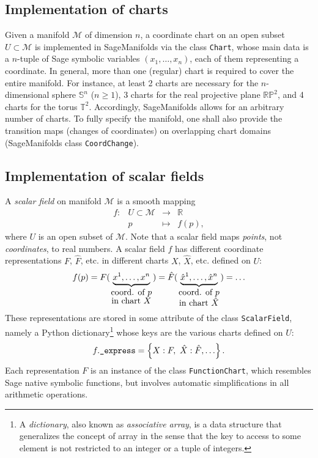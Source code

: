 \documentclass[a4paper]{jpconf}
\newcommand{\soft}[1]{\textsf{#1}}
\newcommand{\code}[1]{\texttt{#1}}
\newcommand{\Sage}{\soft{Sage}}
\newcommand{\SM}{\soft{SageManifolds}}
\newcommand{\be}{\begin{equation}}
\newcommand{\ee}{\end{equation}}
\begin{document}
\subsection{Implementation of charts}

Given a manifold $\mathcal{M}$ of dimension $n$, a coordinate chart 
on an open subset $U\subset\mathcal{M}$ is implemented in \SM{} 
via the class \code{Chart}, whose main data is 
a $n$-tuple of \Sage{} symbolic variables $(x_1,\ldots,x_n)$, each of 
them representing a coordinate.
In general, more than one (regular) chart is required to cover the entire manifold.
For instance, at least 2 charts are necessary for the $n$-dimensional sphere 
$\mathbb{S}^n$ ($n\geq 1$), 3 charts for the real projective plane
$\mathbb{RP}^2$, and 4 charts for the torus $\mathbb{T}^2$. 
Accordingly, \SM{} allows for an arbitrary number of charts. 
To fully specify the manifold, one shall also provide the transition maps
(changes of coordinates) on
overlapping chart domains (\SM{} class \code{CoordChange}).


\subsection{Implementation of scalar fields}

A \emph{scalar field} on manifold $\mathcal{M}$ is a smooth mapping
\be
    \begin{array}{lcll}
    f: & U\subset \mathcal{M}&\longrightarrow &\mathbb{R} \\
       & p & \longmapsto  & f(p) ,
    \end{array}
\ee
where $U$ is an open subset of $\mathcal{M}$.
Note that a scalar field maps \emph{points}, not \emph{coordinates}, to real numbers. 
A scalar field $f$ has different coordinate representations $F$, $\hat F$, etc. 
in different charts $X$, $\hat X$, etc. defined on $U$:
\be
    f(p) = 
F(\underbrace{x^1,\ldots, x^n}_{\mbox{coord. of $p$}\atop\mbox{in chart $X$}}) 
= {\hat F}(\underbrace{{\hat x}^1,\ldots, {\hat x}^n}_{\mbox{coord. of $p$}\atop\mbox{in chart $\hat X$}})
= \ldots
\ee
These representations are 
stored in some attribute of the class \code{ScalarField}, namely a 
Python dictionary\footnote{A \emph{dictionary}, also known as \emph{associative array}, is a 
data structure that generalizes the concept of array in the sense that the
key to access to some element is not restricted to an integer or a tuple of integers.} 
whose keys are the various charts defined on $U$:
\be \label{e:f_express}
 f.\mbox{\texttt{\_express}} = \left\{ X: F,\ \hat X: \hat F, \ldots \right\} .
\ee
Each representation $F$ is an instance of the class \code{FunctionChart}, 
which resembles \Sage{} native symbolic functions, but involves 
automatic simplifications in all arithmetic operations. 
\end{document}
